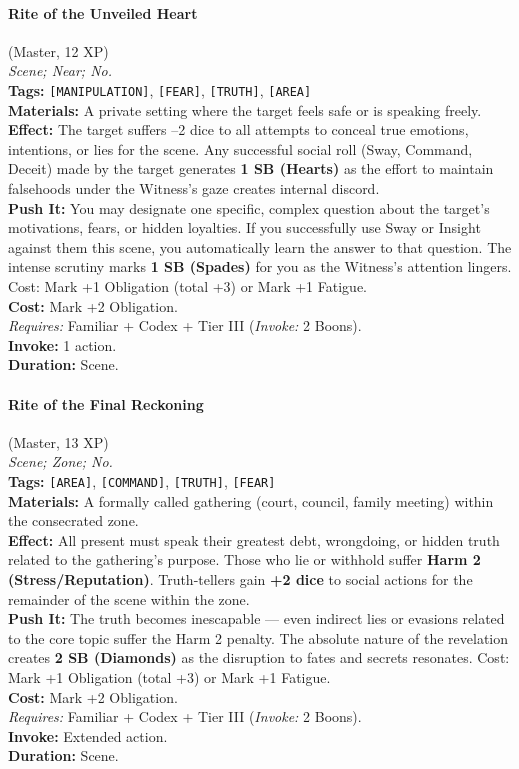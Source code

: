 \paragraph{Rite of the Unveiled Heart} (Master, 12 XP) \hfill \\
\emph{Scene; Near; No.} \\
\textbf{Tags:} \texttt{[MANIPULATION]}, \texttt{[FEAR]}, \texttt{[TRUTH]}, \texttt{[AREA]} \\
\textbf{Materials:} A private setting where the target feels safe or is speaking freely. \\
\textbf{Effect:} The target suffers --2 dice to all attempts to conceal true emotions, intentions, or lies for the scene. Any successful social roll (Sway, Command, Deceit) made by the target generates \textbf{1 SB (Hearts)} as the effort to maintain falsehoods under the Witness's gaze creates internal discord. \\
\textbf{Push It:} You may designate one specific, complex question about the target's motivations, fears, or hidden loyalties. If you successfully use Sway or Insight against them this scene, you automatically learn the answer to that question. The intense scrutiny marks \textbf{1 SB (Spades)} for you as the Witness's attention lingers. Cost: Mark +1 Obligation (total +3) or Mark +1 Fatigue. \\
\textbf{Cost:} Mark +2 Obligation. \\
\textit{Requires:} Familiar + Codex + Tier III (\textit{Invoke:} 2 Boons). \\
\textbf{Invoke:} 1 action. \\
\textbf{Duration:} Scene.

\paragraph{Rite of the Final Reckoning} (Master, 13 XP) \hfill \\
\emph{Scene; Zone; No.} \\
\textbf{Tags:} \texttt{[AREA]}, \texttt{[COMMAND]}, \texttt{[TRUTH]}, \texttt{[FEAR]} \\
\textbf{Materials:} A formally called gathering (court, council, family meeting) within the consecrated zone. \\
\textbf{Effect:} All present must speak their greatest debt, wrongdoing, or hidden truth related to the gathering's purpose. Those who lie or withhold suffer \textbf{Harm 2 (Stress/Reputation)}. Truth-tellers gain \textbf{+2 dice} to social actions for the remainder of the scene within the zone. \\
\textbf{Push It:} The truth becomes inescapable --- even indirect lies or evasions related to the core topic suffer the Harm 2 penalty. The absolute nature of the revelation creates \textbf{2 SB (Diamonds)} as the disruption to fates and secrets resonates. Cost: Mark +1 Obligation (total +3) or Mark +1 Fatigue. \\
\textbf{Cost:} Mark +2 Obligation. \\
\textit{Requires:} Familiar + Codex + Tier III (\textit{Invoke:} 2 Boons). \\
\textbf{Invoke:} Extended action. \\
\textbf{Duration:} Scene.

